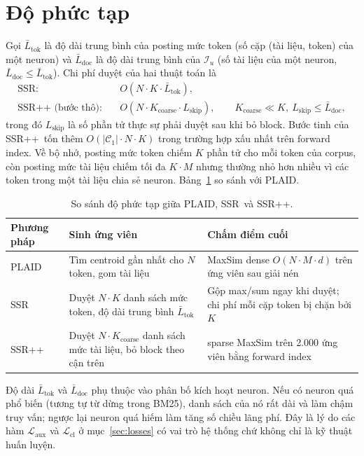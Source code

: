 \documentclass[a4paper,13pt]{extreport}
\theoremstyle{plain}
\newcommand{\ssr}{SSR}
\newcommand{\ssrpp}{SSR++}
\begin{document}
\section{Độ phức tạp}
\label{sec:complexity}
Gọi $\bar L_{\mathrm{tok}}$ là độ dài trung bình của posting mức token (số cặp (tài liệu, token) của một neuron) và $\bar L_{\mathrm{doc}}$ là độ dài trung bình của $\mathcal{I}_u$ (số tài liệu của một neuron, $\bar L_{\mathrm{doc}}\le\bar L_{\mathrm{tok}}$). Chi phí duyệt của hai thuật toán là
\begin{align}
\text{\ssr:}&\quad O(N\cdot K\cdot\bar L_{\mathrm{tok}}), \label{eq:cx-ssr}\\
\text{\ssrpp\ (bước thô):}&\quad O(N\cdot K_{\mathrm{coarse}}\cdot L_{\mathrm{skip}}),\qquad K_{\mathrm{coarse}}\ll K,\ L_{\mathrm{skip}}\le\bar L_{\mathrm{doc}}, \label{eq:cx-ssrpp}
\end{align}
trong đó $L_{\mathrm{skip}}$ là số phần tử thực sự phải duyệt sau khi bỏ block. Bước tinh của \ssrpp\ tốn thêm $O(|\mathcal{C}_1|\cdot N\cdot K)$ trong trường hợp xấu nhất trên forward index. Về bộ nhớ, posting mức token chiếm $K$ phần tử cho mỗi token của corpus, còn posting mức tài liệu chiếm tối đa $K\cdot M$ nhưng thường nhỏ hơn nhiều vì các token trong một tài liệu chia sẻ neuron. Bảng~\ref{tab:complexity} so sánh với PLAID.

\begin{table}[htbp]
\centering
\caption{So sánh độ phức tạp giữa PLAID, \ssr\ và \ssrpp.}
\label{tab:complexity}
\small
\begin{tabular}{p{2cm}p{5.4cm}p{5.6cm}}
\toprule
\textbf{Phương pháp} & \textbf{Sinh ứng viên} & \textbf{Chấm điểm cuối}\\
\midrule
PLAID & Tìm centroid gần nhất cho $N$ token, gom tài liệu & MaxSim dense $O(N\cdot M\cdot d)$ trên ứng viên sau giải nén\\
\ssr & Duyệt $N\cdot K$ danh sách mức token, độ dài trung bình $\bar L_{\mathrm{tok}}$ & Gộp max/sum ngay khi duyệt; chi phí mỗi cặp token bị chặn bởi $K$\\
\ssrpp & Duyệt $N\cdot K_{\mathrm{coarse}}$ danh sách mức tài liệu, bỏ block theo cận trên & sparse MaxSim trên 2.000 ứng viên bằng forward index\\
\bottomrule
\end{tabular}
\end{table}
Độ dài $\bar L_{\mathrm{tok}}$ và $\bar L_{\mathrm{doc}}$ phụ thuộc vào phân bố kích hoạt neuron. Nếu có neuron quá phổ biến (tương tự từ dừng trong BM25), danh sách của nó rất dài và làm chậm truy vấn; ngược lại neuron quá hiếm làm tăng số chiều lãng phí. Đây là lý do các hàm $\mathcal{L}_{\mathrm{aux}}$ và $\mathcal{L}_{\mathrm{cl}}$ ở mục~\ref{sec:losses} có vai trò hệ thống chứ không chỉ là kỹ thuật huấn luyện.
\end{document}
